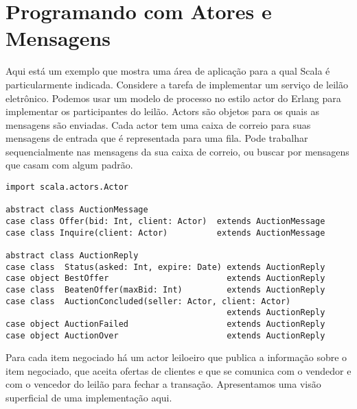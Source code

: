 \chapter{Programando com Atores e Mensagens}
\label{chap:example-auction}
Aqui est\'{a} um exemplo que mostra uma \'{a}rea de aplica\c{c}\~{a}o para a qual Scala 
\'{e} particularmente indicada. Considere a tarefa de implementar um servi\c{c}o
de leil\~{a}o eletr\^{o}nico. Podemos usar um modelo de processo no estilo 
actor do Erlang para implementar os participantes do leil\~{a}o. Actors s\~{a}o 
objetos para os quais as mensagens s\~{a}o enviadas. Cada actor tem uma caixa de correio 
para suas mensagens de entrada que \'{e} representada para uma fila. Pode
trabalhar sequencialmente nas mensagens da sua caixa de correio, ou buscar 
por mensagens que casam com algum padr\~{a}o. 
\begin{lstlisting}[style=floating,label=fig:simple-auction-msgs,caption=Message
    Classes for an Auction Service]
import scala.actors.Actor

abstract class AuctionMessage
case class Offer(bid: Int, client: Actor)  extends AuctionMessage
case class Inquire(client: Actor)          extends AuctionMessage

abstract class AuctionReply
case class  Status(asked: Int, expire: Date) extends AuctionReply
case object BestOffer                        extends AuctionReply
case class  BeatenOffer(maxBid: Int)         extends AuctionReply
case class  AuctionConcluded(seller: Actor, client: Actor) 
                                             extends AuctionReply
case object AuctionFailed                    extends AuctionReply
case object AuctionOver                      extends AuctionReply
\end{lstlisting}
Para cada item negociado h\'{a} um actor leiloeiro que publica a 
informa\c{c}\~{a}o sobre o item negociado, que aceita ofertas de clientes
e que se comunica com o vendedor e com o vencedor do leil\~{a}o 
para fechar a transa\c{c}\~{a}o. Apresentamos uma vis\~{a}o superficial de uma
 implementa\c{c}\~{a}o aqui.

